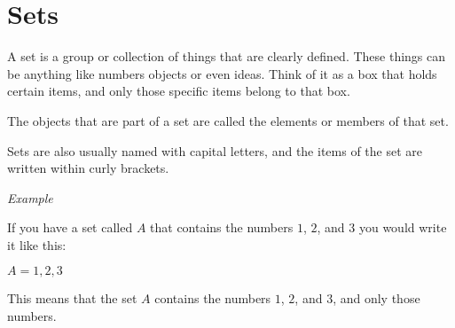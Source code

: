 \documentclass[]{book}
\begin{document}
\section{Sets}

A set is a group or collection of things that are clearly defined. These things can be anything like numbers objects or even ideas. Think of it as 
a box that holds certain items, and only those specific items belong to that box.

The objects that are part of a set are called the elements or members of that set. 

Sets are also usually named with capital letters, and the items of the set are written within curly brackets.

\vspace{0.5 cm}
\textit{Example}

If you have a set called $A$ that contains the numbers $1$, $2$, and $3$ you would write it like this:

$A={1,2,3}$

This means that the set $A$ contains the numbers $1$, $2$, and $3$, and only those numbers.
\end{document}
